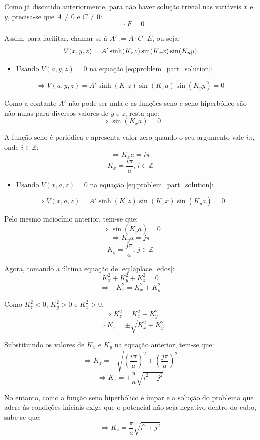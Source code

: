 \documentclass{report}
\begin{document}
Como já discutido anteriormente, para não haver solução trivial nas variáveis $ x $ e $ y $, precisa-se que $ A \neq 0 $ e $ C \neq 0 $:
$$ \Rightarrow F = 0 $$

Assim, para facilitar, chamar-se-á $ A' := A\cdot C\cdot E $, ou seja:
\begin{equation}
    \label{eq:problem_part_solution}
    \centering
    V(x, y, z) = A'\sinh(K_zz)\sin(K_xx)\sin(K_yy)
\end{equation}

\begin{itemize}
  \item Usando $ V(a, y, z) = 0 $ na equação \ref{eq:problem_part_solution}:
\end{itemize}
$$ \Rightarrow V(a, y, z) = A'\sinh(K_zz)\sin(K_xa)\sin(K_yy) = 0 $$

Como a contante $ A' $ não pode ser nula e as funções seno e seno hiperbólico são não nulas para diversos valores de $ y $ e $ z $, resta que:
$$ \Rightarrow \sin(K_xa) = 0 $$

A função seno é periódica e apresenta valor zero quando o seu argumento vale $ i\pi $, onde $ i \in \mathbb{Z} $:
$$ \Rightarrow K_xa = i\pi $$
$$ K_x = \frac{i\pi}{a},\, i \in \mathbb{Z} $$

\begin{itemize}
  \item Usando $ V(x, a, z) = 0 $ na equação \ref{eq:problem_part_solution}:
\end{itemize}
$$ \Rightarrow V(x, a, z) = A'\sinh(K_zz)\sin(K_xx)\sin(K_ya) = 0 $$

Pelo mesmo raciocínio anterior, tem-se que:
$$ \Rightarrow \sin(K_ya) = 0 $$
$$ \Rightarrow K_ya = j\pi $$
$$ K_y = \frac{j\pi}{a},\, j \in \mathbb{Z} $$

Agora, tomando a última equação de \ref{eq:laplace_edos}:
$$ K_x^2 + K_y^2 + K_z^2 = 0 $$
$$ \Rightarrow -K_z^2 = K_x^2 + K_y^2 $$

Como $ K_z^2 < 0 $, $ K_y^2 > 0 $ e $ K_x^2 > 0 $,
$$ \Rightarrow K_z^2 = K_x^2 + K_y^2 $$
$$ \Rightarrow K_z = \pm\sqrt{K_x^2 + K_y^2} $$

Substituindo os valores de $ K_x $ e $ K_y $ na equação anterior, tem-se que:
$$ \Rightarrow K_z = \pm\sqrt{\left(\frac{i\pi}{a}\right)^2 + \left(\frac{j\pi}{a}\right)^2} $$
$$ \Rightarrow K_z = \pm\frac{\pi}{a}\sqrt{i^2 + j^2} $$

No entanto, como a função seno hiperbólico é ímpar e a solução do problema que adere
às condições iniciais exige que o potencial não seja negativo dentro do cubo, sabe-se que:
$$ \Rightarrow K_z = \frac{\pi}{a}\sqrt{i^2 + j^2} $$
\end{document}
